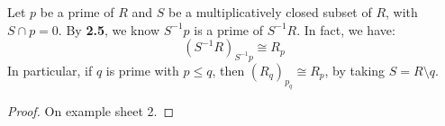 \documentclass[10pt,a4paper]{article}
\begin{document}
\begin{lemma}
  Let $p$ be a prime of $R$ and $S$ be a multiplicatively closed subset of $R$, with $S\cap p = 0$. By \textbf{2.5}, we know $S^{-1}p$ is a prime of $S^{-1}R$. In fact, we have:
  \[(S^{-1}R)_{S^{-1}p} \cong R_p\]
  In particular, if $q$ is prime with $p \leq q$, then $(R_q)_{p_q} \cong R_p$, by taking $S = R\setminus q$.
\end{lemma}
\begin{proof}
  On example sheet 2.
\end{proof}
\end{document}
